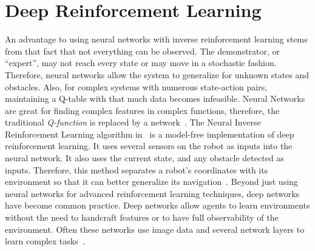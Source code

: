 \documentclass[12pt,american]{report}
\begin{document}
\section{Deep Reinforcement Learning}
An advantage to using neural networks with inverse reinforcement learning stems from that fact that not everything can be observed. The demonstrator, or ``expert'', may not reach every state or may move in a stochastic fashion. Therefore, neural networks allow the system to generalize for unknown states and obstacles. Also, for complex systems with numerous state-action pairs, maintaining a Q-table with that much data becomes infeasible. Neural Networks are great for finding complex features in complex functions, therefore, the traditional \textit{Q-function} is replaced by a network~\cite{matiisen_2015}. The Neural Inverse Reinforcement Learning algorithm in~\cite{xia2016neural} is a model-free implementation of deep reinforcement learning. It uses several sensors on the robot as inputs into the neural network.  It also uses the current state, and any obstacle detected as inputs. Therefore, this method separates a robot's coordinates with its environment so that it can better generalize its navigation~\cite{xia2016neural}. Beyond just using neural networks for advanced reinforcement learning techniques, deep networks have become common practice. Deep networks allow agents to learn environments without the need to handcraft features or to have full observability of the environment. Often these networks use image data and several network layers to learn complex tasks~\cite{atari}.
	
\end{document}
